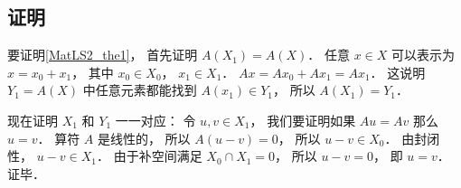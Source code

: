 \subsection{证明}
要证明\autoref{MatLS2_the1}， 首先证明 $A(X_1) = A(X)$． 任意 $x\in X$ 可以表示为 $x = x_0 + x_1$， 其中 $x_0\in X_0$， $x_1\in X_1$． $Ax = A x_0 + A x_1 = A x_1$． 这说明 $Y_1 = A(X)$ 中任意元素都能找到 $A(x_1) \in Y_1$， 所以 $A(X_1) = Y_1$．

现在证明 $X_1$ 和 $Y_1$ 一一对应： 令 $u, v \in X_1$， 我们要证明如果 $Au = Av$ 那么 $u = v$． 算符 $A$ 是线性的， 所以 $A(u-v) = 0$， 所以 $u - v \in X_0$． 由封闭性， $u - v \in X_1$． 由于补空间满足 $X_0 \cap X_1 = \qty{0}$， 所以 $u - v = 0$， 即 $u = v$． 证毕．

